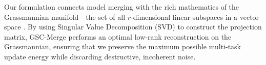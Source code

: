 Our formulation connects model merging with the rich mathematics of the Grassmannian manifold—the set of all $r$-dimensional linear subspaces in a vector space \cite{edelman1998geometry}. By using Singular Value Decomposition (SVD) to construct the projection matrix, GSC-Merge performs an optimal low-rank reconstruction on the Grassmannian, ensuring that we preserve the maximum possible multi-task update energy while discarding destructive, incoherent noise.
